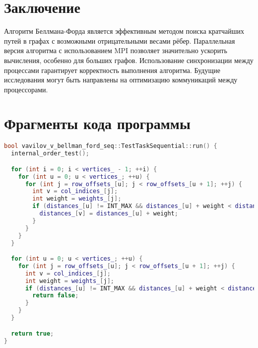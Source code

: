 \documentclass[12pt]{article}
\begin{document}
\section{Заключение}
Алгоритм Беллмана-Форда является эффективным методом поиска кратчайших путей в графах с возможными отрицательными весами рёбер. Параллельная версия алгоритма с использованием MPI позволяет значительно ускорить вычисления, особенно для больших графов. Использование синхронизации между процессами гарантирует корректность выполнения алгоритма. Будущие исследования могут быть направлены на оптимизацию коммуникаций между процессорами.

\section{Фрагменты кода программы}

\begin{lstlisting}[language=C++, caption={Последовательная реализация алгоритма Беллмана–Форда}, breaklines=true]
bool vavilov_v_bellman_ford_seq::TestTaskSequential::run() {
  internal_order_test();

  for (int i = 0; i < vertices_ - 1; ++i) {
    for (int u = 0; u < vertices_; ++u) {
      for (int j = row_offsets_[u]; j < row_offsets_[u + 1]; ++j) {
        int v = col_indices_[j];
        int weight = weights_[j];
        if (distances_[u] != INT_MAX && distances_[u] + weight < distances_[v]) {
          distances_[v] = distances_[u] + weight;
        }
      }
    }
  }

  for (int u = 0; u < vertices_; ++u) {
    for (int j = row_offsets_[u]; j < row_offsets_[u + 1]; ++j) {
      int v = col_indices_[j];
      int weight = weights_[j];
      if (distances_[u] != INT_MAX && distances_[u] + weight < distances_[v]) {
        return false;
      }
    }
  }

  return true;
}

\end{lstlisting}
\end{document}
